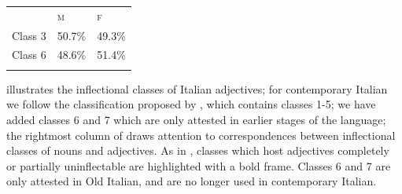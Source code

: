 \documentclass[output=paper]{langscibook}
\begin{document}
\begin{table}
\caption{Percentage of masculine and feminine nouns in classes 3 and 6}
\label{tab:key:3}
\end{table}


\begin{tabularx}{\textwidth}{XXX}
 & \textsc{m} & \textsc{f}\\
\lsptoprule
Class 3 & 50.7\% & 49.3\%\\
Class 6 & 48.6\% & 51.4\%\\
\lspbottomrule
\end{tabularx}
 illustrates the inflectional classes of Italian adjectives; for contemporary Italian we follow the classification proposed by \citet{IacobiniThornton2016}, which contains classes 1-5; we have added classes 6 and 7 which are only attested in earlier stages of the language; the rightmost column of  draws attention to correspondences between inflectional classes of nouns and adjectives. As in , classes which host adjectives completely or partially uninflectable are highlighted with a bold frame. Classes 6 and 7 are only attested in Old Italian, and are no longer used in contemporary Italian.

\begin{stylelsTable}%
\begin{table}
\caption{Inflectional classes of Italian adjectives}
\label{tab:key:4}
\end{table}\end{stylelsTable}
\end{document}
